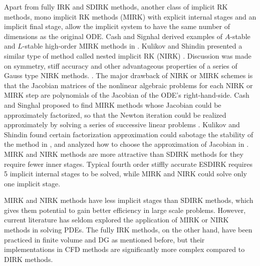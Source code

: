 Apart from fully IRK and SDIRK methods,
another class of implicit RK methods,
mono implicit RK methods (MIRK)
\cite{cash1975classMIRKOrig}
with explicit internal stages and
an implicit final
stage,
allow the implicit system to
have the same number of dimensions
as the original ODE.
Cash and Signhal derived examples of
$A$-stable and $L$-stable high-order
MIRK methods in
\cite{cash1977clasMIRK1,cash1982monoMIRK2}.
Kulikov and Shindin presented a similar type
of method called nested implicit RK (NIRK)
\cite{kulikov2006familyNIRKOrig}.
Discussion was made on symmetry, stiff accuracy and
other advantageous properties of a series of Gauss type
NIRK methods.
\cite{kulikov2009adaptive}.
The major drawback of NIRK or MIRK schemes is that
the Jacobian matrices of the nonlinear algebraic problems
for each NIRK or MIRK step are
polynomials of the Jacobian of the ODE's right-hand-side.
Cash and Singhal proposed to find MIRK methods whose
Jacobian could be approximately factorized,
so that the Newton iteration
could be realized approximately by solving a series of successive linear
problems \cite{cash1982monoMIRK2}.
Kulikov and Shindin found certain factorization
approximation could sabotage the stability of
the method in
\cite{kulikov2009adaptive},
and analyzed how to choose the approximation of
Jacobian in
\cite{kulikov2007asymptotic}.
MIRK and NIRK methods are more attractive than SDIRK methods
for they require fewer inner stages.
Typical fourth order
stiffly accurate ESDIRK requires 5 implicit internal stages to be
solved,
while MIRK and NIRK could
solve only one implicit stage.


MIRK and NIRK methods have less
implicit stages than SDIRK methods,
which gives them potential to gain better efficiency in
large scale problems.
However, current literature has seldom explored
the application of MIRK or NIRK methods in
solving PDEs.
The fully IRK methods, on the other hand,
have been practiced in
finite volume \cite{jameson2017evaluation} and
DG \cite{pazner2017stage}
as mentioned before,
but their implementations
in CFD methods are significantly more
complex compared to DIRK methods.

